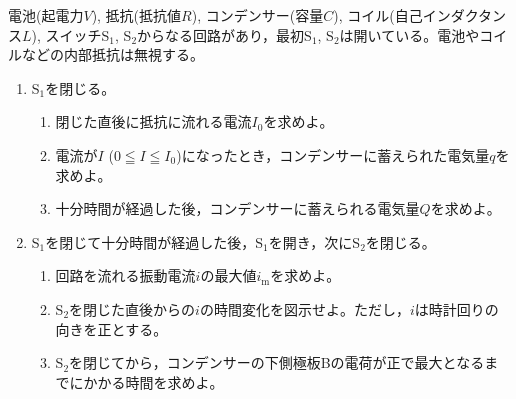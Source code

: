 \item
    \begin{mawarikomi}{150pt}{
        
    }
    電池(起電力$V$), 抵抗(抵抗値$R$), コンデンサー(容量$C$), コイル(自己インダクタンス$L$), スイッチS$_1$, S$_2$からなる回路があり，最初S$_1$, S$_2$は開いている。電池やコイルなどの内部抵抗は無視する。
    \begin{enumerate}
        \item S$_1$を閉じる。
        \begin{enumerate}[(ア)]
            \item 閉じた直後に抵抗に流れる電流$I_0$を求めよ。
            \item 電流が$I$ ($0 \leqq I \leqq I_0$)になったとき，コンデンサーに蓄えられた電気量$q$を求めよ。
            \item 十分時間が経過した後，コンデンサーに蓄えられる電気量$Q$を求めよ。
        \end{enumerate}
        \item S$_1$を閉じて十分時間が経過した後，S$_1$を開き，次にS$_2$を閉じる。
        \begin{enumerate}[(ア)]
            \item 回路を流れる振動電流$i$の最大値$i_\mathrm{m}$を求めよ。
            \item S$_2$を閉じた直後からの$i$の時間変化を図示せよ。ただし，$i$は時計回りの向きを正とする。
            \item S$_2$を閉じてから，コンデンサーの下側極板Bの電荷が正で最大となるまでにかかる時間を求めよ。
        \end{enumerate}
    \end{enumerate}
    \end{mawarikomi}
